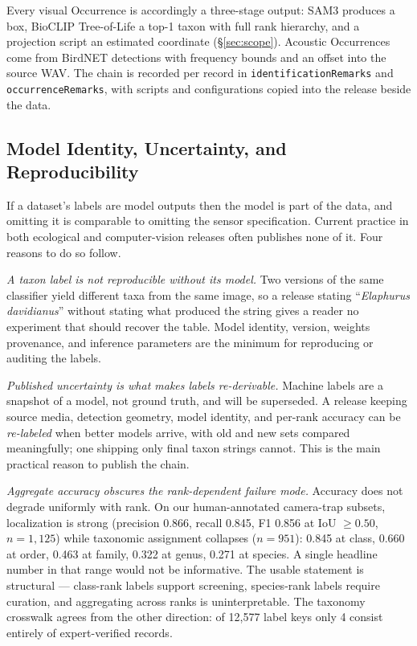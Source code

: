 \documentclass[sigconf]{acmart}
\begin{document}
Every visual Occurrence is accordingly a three-stage output: SAM3
produces a box, BioCLIP Tree-of-Life a top-1 taxon with full rank
hierarchy, and a projection script an estimated coordinate
(\S\ref{sec:scope}). Acoustic Occurrences come from BirdNET detections
with frequency bounds and an offset into the source WAV. The chain is
recorded per record in \texttt{identificationRemarks} and
\texttt{occurrenceRemarks}, with scripts and configurations copied into
the release beside the data.

\subsection{Model Identity, Uncertainty, and Reproducibility}
\label{sec:modelprov}

If a dataset's labels are model outputs then the model is part of the
data, and omitting it is comparable to omitting the sensor
specification. Current practice in both ecological and computer-vision
releases often publishes none of it. Four reasons to do so follow.

\emph{A taxon label is not reproducible without its model.} Two versions
of the same classifier yield different taxa from the same image, so a
release stating ``\emph{Elaphurus davidianus}'' without stating what
produced the string gives a reader no experiment that should recover the
table. Model identity, version, weights provenance, and inference
parameters are the minimum for reproducing or auditing the labels.

\emph{Published uncertainty is what makes labels re-derivable.} Machine
labels are a snapshot of a model, not ground truth, and will be
superseded. A release keeping source media, detection geometry, model
identity, and per-rank accuracy can be \emph{re-labeled} when better
models arrive, with old and new sets compared meaningfully; one shipping
only final taxon strings cannot. This is the main practical reason to
publish the chain.

\emph{Aggregate accuracy obscures the rank-dependent failure mode.}
Accuracy does not degrade uniformly with rank. On our human-annotated
camera-trap subsets, localization is strong (precision 0.866, recall
0.845, F1 0.856 at IoU $\geq 0.50$, $n{=}1{,}125$) while taxonomic
assignment collapses ($n{=}951$): 0.845 at class, 0.660 at order,
0.463 at family, 0.322 at genus, 0.271 at species. A single headline number in that range would
not be informative. The usable statement is structural ---
class-rank labels support screening, species-rank labels require
curation, and aggregating across ranks is uninterpretable. The taxonomy
crosswalk agrees from the other direction: of 12{,}577 label keys only 4
consist entirely of expert-verified records.
\end{document}
